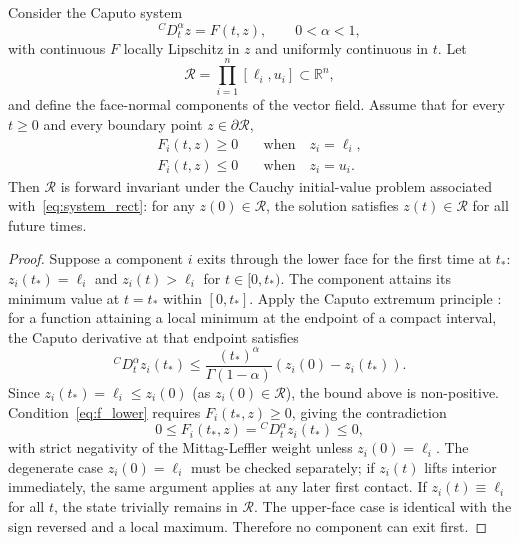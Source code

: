 \begin{theorem}
\label{thm:T17}
Consider the Caputo system
\begin{equation}
{}^C D_t^\alpha z = F(t, z),\qquad 0 < \alpha < 1,
\label{eq:system_rect}
\end{equation}
with continuous \(F\) locally Lipschitz in \(z\) and uniformly continuous in \(t\). Let
\begin{equation}
\mathcal{R} = \prod_{i=1}^n [\ell_i, u_i] \subset \mathbb{R}^n,
\label{eq:rectangle}
\end{equation}
and define the face-normal components of the vector field. Assume that for every \(t \ge 0\) and every boundary point \(z \in \partial \mathcal{R}\),
\begin{align}
F_i(t, z) \ge 0 \quad&\text{when}\quad z_i = \ell_i, \label{eq:f_lower} \\
F_i(t, z) \le 0 \quad&\text{when}\quad z_i = u_i. \label{eq:f_upper}
\end{align}
Then \(\mathcal{R}\) is forward invariant under the Cauchy initial-value problem associated with~\eqref{eq:system_rect}: for any \(z(0) \in \mathcal{R}\), the solution satisfies \(z(t) \in \mathcal{R}\) for all future times.
\end{theorem}

\begin{proof}
Suppose a component \(i\) exits through the lower face for the first time at \(t_*\): \(z_i(t_*) = \ell_i\) and \(z_i(t) > \ell_i\) for \(t \in [0, t_*)\). The component attains its minimum value at \(t = t_*\) within \([0, t_*]\). Apply the Caputo extremum principle \citep{li2010, diethelm2010}: for a function attaining a local minimum at the endpoint of a compact interval, the Caputo derivative at that endpoint satisfies
\[
{}^C D_t^\alpha z_i(t_*)
\le \frac{(t_*)^{\alpha}}{\Gamma(1 - \alpha)} (z_i(0) - z_i(t_*)).
\]
Since \(z_i(t_*) = \ell_i \le z_i(0)\) (as \(z_i(0) \in \mathcal{R}\)), the bound above is non-positive. Condition~\eqref{eq:f_lower} requires \(F_i(t_*, z) \ge 0\), giving the contradiction
\[
0 \le F_i(t_*, z) = {}^C D_t^\alpha z_i(t_*) \le 0,
\]
with strict negativity of the Mittag-Leffler weight unless \(z_i(0) = \ell_i\). The degenerate case \(z_i(0) = \ell_i\) must be checked separately; if \(z_i(t)\) lifts interior immediately, the same argument applies at any later first contact. If \(z_i(t) \equiv \ell_i\) for all \(t\), the state trivially remains in \(\mathcal{R}\). The upper-face case is identical with the sign reversed and a local maximum. Therefore no component can exit first.
\end{proof}

